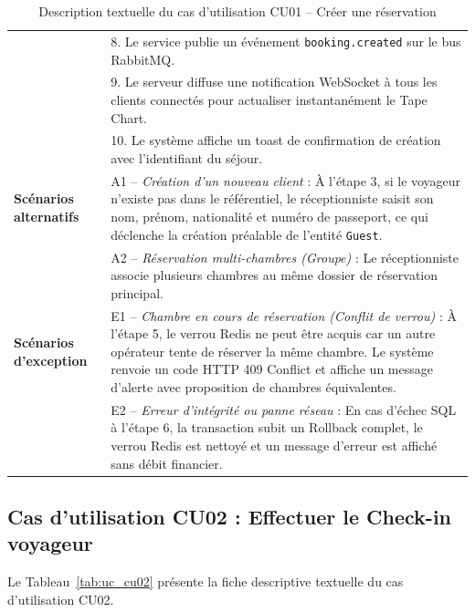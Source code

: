 \documentclass[12pt,a4paper,oneside]{report}
\begin{document}
\begin{table}[H]
\begin{tabularx}{\textwidth}{|p{3.5cm}|X|}
& 8. Le service publie un événement \texttt{booking.created} sur le bus RabbitMQ.\\
& 9. Le serveur diffuse une notification WebSocket à tous les clients connectés pour actualiser instantanément le Tape Chart.\\
& 10. Le système affiche un toast de confirmation de création avec l'identifiant du séjour.\\
\hline
\textbf{Scénarios alternatifs} & 
A1 -- \textit{Création d'un nouveau client} : À l'étape 3, si le voyageur n'existe pas dans le référentiel, le réceptionniste saisit son nom, prénom, nationalité et numéro de passeport, ce qui déclenche la création préalable de l'entité \texttt{Guest}.\\
& A2 -- \textit{Réservation multi-chambres (Groupe)} : Le réceptionniste associe plusieurs chambres au même dossier de réservation principal.\\
\hline
\textbf{Scénarios d'exception} & 
E1 -- \textit{Chambre en cours de réservation (Conflit de verrou)} : À l'étape 5, le verrou Redis ne peut être acquis car un autre opérateur tente de réserver la même chambre. Le système renvoie un code HTTP 409 Conflict et affiche un message d'alerte avec proposition de chambres équivalentes.\\
& E2 -- \textit{Erreur d'intégrité ou panne réseau} : En cas d'échec SQL à l'étape 6, la transaction subit un Rollback complet, le verrou Redis est nettoyé et un message d'erreur est affiché sans débit financier.\\
\hline
\end{tabularx}
\caption{Description textuelle du cas d'utilisation CU01 -- Créer une réservation}
\label{tab:uc_cu01}
\end{table}

\subsection{Cas d'utilisation CU02 : Effectuer le Check-in voyageur}

Le Tableau~\ref{tab:uc_cu02} présente la fiche descriptive textuelle du cas d'utilisation CU02.
\end{document}
